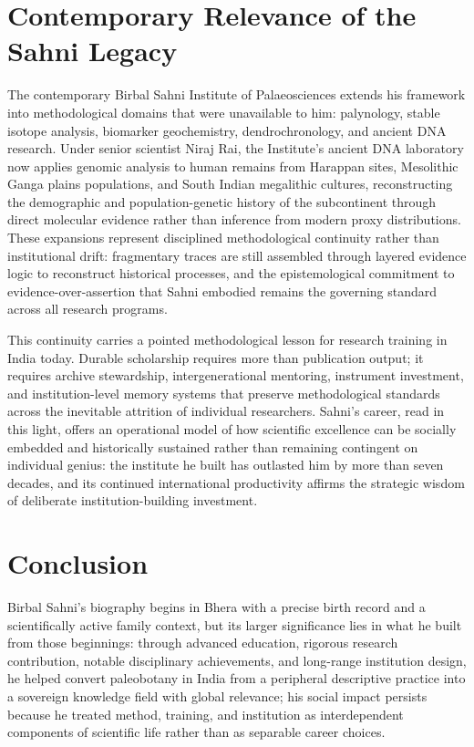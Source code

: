 \documentclass[10pt]{article}
\begin{document}
\section*{Contemporary Relevance of the Sahni Legacy}

The contemporary Birbal Sahni Institute of Palaeosciences extends his framework into methodological domains that were unavailable to him: palynology, stable isotope analysis, biomarker geochemistry, dendrochronology, and ancient DNA research.\cite{dna_lab,palaeoscience_today} Under senior scientist Niraj Rai, the Institute's ancient DNA laboratory now applies genomic analysis to human remains from Harappan sites, Mesolithic Ganga plains populations, and South Indian megalithic cultures, reconstructing the demographic and population-genetic history of the subcontinent through direct molecular evidence rather than inference from modern proxy distributions.\cite{dna_lab} These expansions represent disciplined methodological continuity rather than institutional drift: fragmentary traces are still assembled through layered evidence logic to reconstruct historical processes, and the epistemological commitment to evidence-over-assertion that Sahni embodied remains the governing standard across all research programs.\cite{sponsored_projects,isti_bsip}

This continuity carries a pointed methodological lesson for research training in India today. Durable scholarship requires more than publication output; it requires archive stewardship, intergenerational mentoring, instrument investment, and institution-level memory systems that preserve methodological standards across the inevitable attrition of individual researchers.\cite{bsip_history,science_state_nation} Sahni's career, read in this light, offers an operational model of how scientific excellence can be socially embedded and historically sustained rather than remaining contingent on individual genius: the institute he built has outlasted him by more than seven decades, and its continued international productivity affirms the strategic wisdom of deliberate institution-building investment.


\section*{Conclusion}

Birbal Sahni's biography begins in Bhera with a precise birth record and a scientifically active family context, but its larger significance lies in what he built from those beginnings: through advanced education, rigorous research contribution, notable disciplinary achievements, and long-range institution design, he helped convert paleobotany in India from a peripheral descriptive practice into a sovereign knowledge field with global relevance; his social impact persists because he treated method, training, and institution as interdependent components of scientific life rather than as separable career choices.\cite{wiki_birbal,from_lahore_lucknow,bsip_history}
\end{document}
